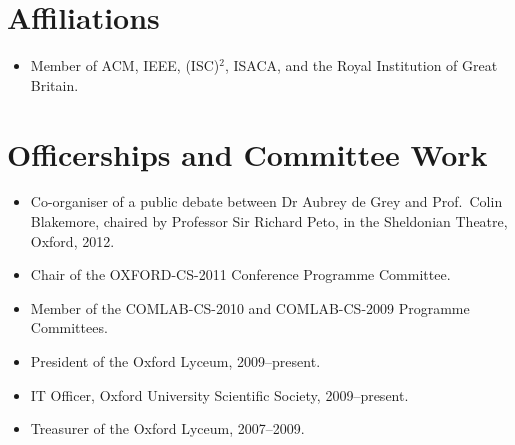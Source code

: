 \documentclass[12pt,twoside,letterpaper]{article}
\begin{document}



\section*{Affiliations}
\vspace{-2mm}
\begin{itemize}
	\item Member of ACM, IEEE, (ISC)$^2$, ISACA, and the Royal Institution of Great Britain.
\end{itemize}

\vspace{-8mm}
\section*{Officerships and Committee Work}
\vspace{-2mm}
\begin{itemize}
	\item Co-organiser of a public debate between
		Dr Aubrey de Grey and Prof.\ Colin Blakemore, chaired by Professor Sir Richard Peto,
		in the Sheldonian Theatre, Oxford, 2012.
	\item Chair of the OXFORD-CS-2011 Conference Programme Committee.
	\item Member of the COMLAB-CS-2010 and COMLAB-CS-2009 Programme Committees.
	\item President of the Oxford Lyceum, 2009--present.
	\item IT Officer, Oxford University Scientific Society, 2009--present.
	\item Treasurer of the Oxford Lyceum, 2007--2009.
\end{itemize}


\vspace{-8mm}
\end{document}
